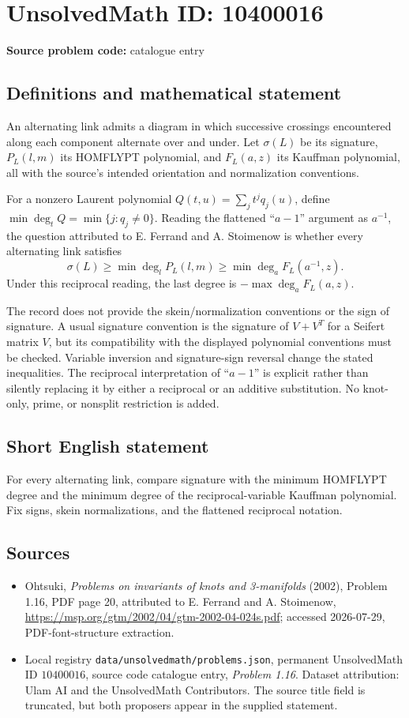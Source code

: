 \documentclass[11pt]{article}
\begin{document}
\section*{UnsolvedMath ID: 10400016}
\textbf{Source problem code:} catalogue entry
\subsection{Definitions and mathematical statement}
An alternating link admits a diagram in which successive crossings encountered along each component alternate over and under. Let $\sigma(L)$ be its signature, $P_L(l,m)$ its HOMFLYPT polynomial, and $F_L(a,z)$ its Kauffman polynomial, all with the source's intended orientation and normalization conventions.

For a nonzero Laurent polynomial $Q(t,u)=\sum_j t^j q_j(u)$, define $\min\deg_t Q=\min\{j:q_j\ne0\}$. Reading the flattened ``$a-1$'' argument as $a^{-1}$, the question attributed to E. Ferrand and A. Stoimenow is whether every alternating link satisfies
\[
\sigma(L)\geq\min\deg_l P_L(l,m)
\geq\min\deg_a F_L(a^{-1},z).
\]
Under this reciprocal reading, the last degree is $-\max\deg_a F_L(a,z)$.

The record does not provide the skein/normalization conventions or the sign of signature. A usual signature convention is the signature of $V+V^T$ for a Seifert matrix $V$, but its compatibility with the displayed polynomial conventions must be checked. Variable inversion and signature-sign reversal change the stated inequalities. The reciprocal interpretation of ``$a-1$'' is explicit rather than silently replacing it by either a reciprocal or an additive substitution. No knot-only, prime, or nonsplit restriction is added.
\subsection{Short English statement}
For every alternating link, compare signature with the minimum HOMFLYPT degree and the minimum degree of the reciprocal-variable Kauffman polynomial. Fix signs, skein normalizations, and the flattened reciprocal notation.
\subsection{Sources}
\begin{itemize}
\item Ohtsuki, \emph{Problems on invariants of knots and 3-manifolds} (2002), Problem 1.16, PDF page 20, attributed to E. Ferrand and A. Stoimenow, \url{https://msp.org/gtm/2002/04/gtm-2002-04-024s.pdf}; accessed 2026-07-29, PDF-font-structure extraction.
\item Local registry \texttt{data/unsolvedmath/problems.json}, permanent UnsolvedMath ID $10400016$, source code catalogue entry, \emph{Problem 1.16}. Dataset attribution: Ulam AI and the UnsolvedMath Contributors. The source title field is truncated, but both proposers appear in the supplied statement.
\end{itemize}
\end{document}
